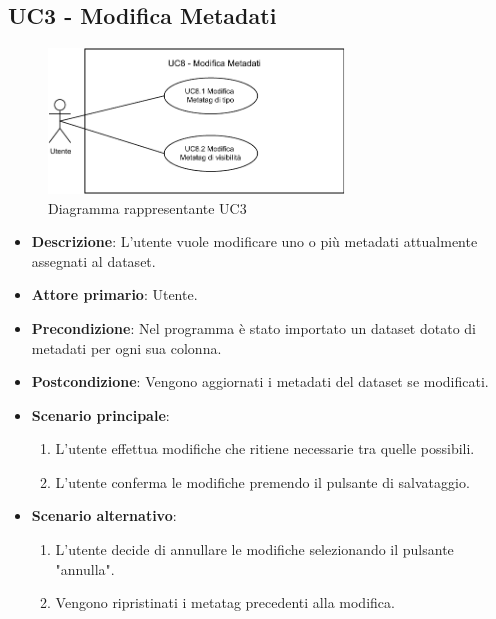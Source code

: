 \newpage
\subsection{UC3 - Modifica Metadati}
\label{subsec:uc3}

\begin{figure}[h]
    \centering
    \includegraphics[width=0.7\textwidth]{componenti/casi-duso/diagrammi/UC3.pdf}
    \caption{Diagramma rappresentante UC3}
    \label{fig:UC3}
\end{figure}

\begin{itemize}
    \item \textbf{Descrizione}: L’utente vuole modificare uno o più metadati attualmente assegnati al dataset.
	
    \item \textbf{Attore primario}: Utente.
    
    \item \textbf{Precondizione}:   Nel programma è stato importato un dataset dotato di metadati per ogni sua colonna.
    \item \textbf{Postcondizione}:  Vengono aggiornati i metadati del dataset se modificati.

	\item \textbf{Scenario principale}:
        \begin{enumerate}
			\item L'utente effettua modifiche che ritiene necessarie tra quelle possibili.
			\item L'utente conferma le modifiche premendo il pulsante di salvataggio.
        \end{enumerate}

    \item \textbf{Scenario alternativo}:
		\begin{enumerate}
			\item L'utente decide di annullare le modifiche selezionando il pulsante "annulla".
			\item Vengono ripristinati i metatag precedenti alla modifica.
        \end{enumerate}
\end{itemize}

